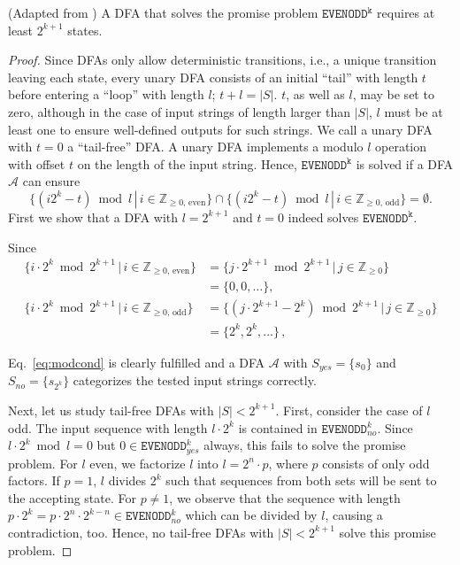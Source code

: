 \documentclass[../main.tex]{subfiles}
\begin{document}
\begin{theorem}\label{theorem:originalpp}
 (Adapted from \cite{bianchi2014complexity}) A DFA that solves the promise problem $\mathtt{EVENODD^k}$ requires at least $2^{k+1}$ states.
\end{theorem}
\begin{proof} 
    Since \acp{DFA} only allow deterministic transitions, i.e., a unique transition leaving each state, every unary DFA consists of an initial ``tail'' with length $t$ before entering a ``loop'' with length $l$; $t + l = |S|$. $t$, as well as $l$, may be set to zero, although in the case of input strings of length larger than $|S|$, $l$ must be at least one to ensure well-defined outputs for such strings. We call a unary DFA with $t=0$ a ``tail-free'' DFA. A unary \ac{DFA} implements a modulo $l$ operation with offset $t$ on the length of the input string.  Hence, $\mathtt{EVENODD^k}$ is solved if a DFA $\mathcal{A}$ can ensure 
\begin{equation}\label{eq:modcond}
    \{ (i2^k - t)\bmod{l} \,|\, i \in \mathbb{Z}_{\geq 0,\,\mathrm{even}} \} \cap
    \{ (i2^k - t)\bmod{l} \,|\, i \in \mathbb{Z}_{\geq 0,\,\mathrm{odd}} \} = \emptyset .
\end{equation} 
First we show that a DFA with $l = 2^{k+1}$ and $t=0$ indeed solves $\mathtt{EVENODD^k}$. 

Since
\begin{align}
    \{ i\cdot2^k\bmod{2^{k+1}} \,|\, i \in \mathbb{Z}_{\geq 0,\,\mathrm{even}} \} &= 
    \{j \cdot 2^{k+1} \bmod{2^{k+1}} \,|\, j \in \mathbb{Z}_{\geq 0} \} \\ &= \{0, 0, \dots\},  \\
    \{ i\cdot2^k\bmod{2^{k+1}} \,|\, i \in \mathbb{Z}_{\geq 0,\,\mathrm{odd}} \} &= 
    \{(j \cdot 2^{k+1} - 2^{k})\bmod{2^{k+1}} \,|\, j \in \mathbb{Z}_{\geq 0} \} \\ &= \{2^{k}, 2^{k}, \dots\}    \, ,
\end{align} 

Eq.~\ref{eq:modcond} is clearly fulfilled and a DFA $\mathcal{A}$ with $S_{yes} = \{s_0\}$ and  $S_{no} = \{s_{2^k}\}$ categorizes the tested input strings correctly.

Next, let us study tail-free DFAs with $|S| < 2^{k+1}$. First, consider the case of $l$ odd. The input sequence with length $l \cdot 2^{k}$ is contained in $\mathtt{EVENODD}_{no}^{k}$. Since $l \cdot 2^{k} \bmod{l} = 0$ but $0 \in \mathtt{EVENODD}_{yes}^{k}$ always, this fails to solve the promise problem.
For $l$ even, we factorize $l$ into $l = 2^{n} \cdot p$, where $p$ consists of only odd factors. If $p = 1$, $l$ divides $2^k$ such that sequences from both sets will be sent to the accepting state. For $p \neq 1$, we observe that the sequence with length $p\cdot2^k = p \cdot 2^n \cdot 2^{k-n} \in \mathtt{EVENODD}_{no}^{k}$ which can be divided by $l$, causing a contradiction, too. Hence, no tail-free DFAs with  $|S| < 2^{k+1}$ solve this promise problem.


\end{proof}
\end{document}
